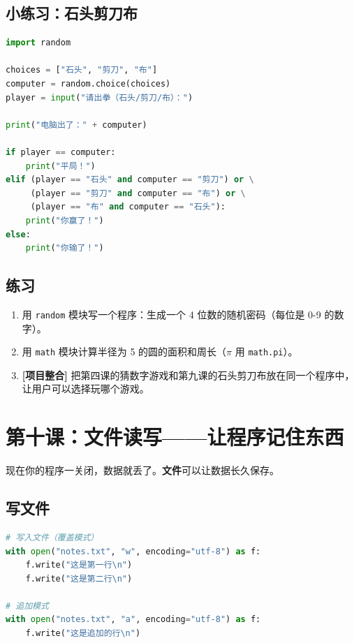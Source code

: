 \documentclass[a4paper,12pt]{ctexart}
\begin{document}
\subsection*{小练习：石头剪刀布}

\begin{lstlisting}[language=Python]
import random

choices = ["石头", "剪刀", "布"]
computer = random.choice(choices)
player = input("请出拳（石头/剪刀/布）：")

print("电脑出了：" + computer)

if player == computer:
    print("平局！")
elif (player == "石头" and computer == "剪刀") or \
     (player == "剪刀" and computer == "布") or \
     (player == "布" and computer == "石头"):
    print("你赢了！")
else:
    print("你输了！")
\end{lstlisting}

\subsection*{练习}

\begin{enumerate}
  \item 用 \texttt{random} 模块写一个程序：生成一个 4 位数的随机密码（每位是 0-9 的数字）。
  \item 用 \texttt{math} 模块计算半径为 5 的圆的面积和周长（$\pi$ 用 \texttt{math.pi}）。
  \item \textbf{[项目整合]} 把第四课的猜数字游戏和第九课的石头剪刀布放在同一个程序中，让用户可以选择玩哪个游戏。
\end{enumerate}

\section*{第十课：文件读写——让程序记住东西}

现在你的程序一关闭，数据就丢了。\textbf{文件}可以让数据长久保存。

\subsection*{写文件}

\begin{lstlisting}[language=Python]
# 写入文件（覆盖模式）
with open("notes.txt", "w", encoding="utf-8") as f:
    f.write("这是第一行\n")
    f.write("这是第二行\n")

# 追加模式
with open("notes.txt", "a", encoding="utf-8") as f:
    f.write("这是追加的行\n")
\end{lstlisting}
\end{document}
